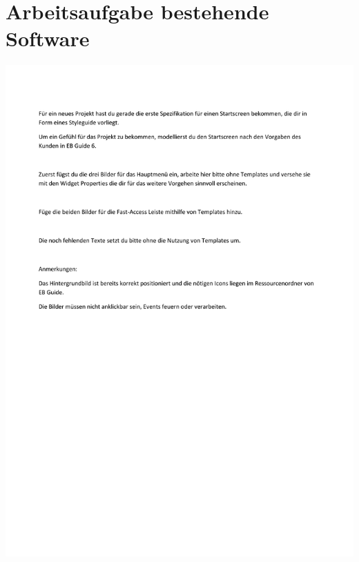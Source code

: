 \chapter{Arbeitsaufgabe bestehende Software}\label{app:Aufgabe_Guide}
\begin{center}
  \includegraphics[scale=0.9]{supplement/Arbeitsaufgabe_Guide.pdf}
\end{center}


